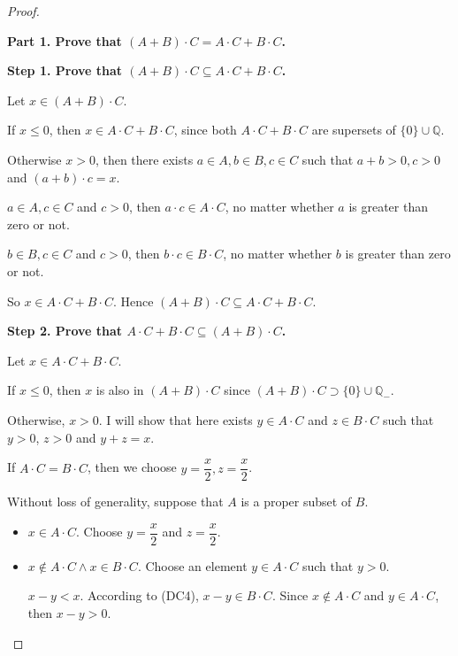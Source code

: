 \begin{proof}
\begin{enumerate}[label={(F\arabic*)}, start=5]
              \textbf{Part 1. Prove that $(A + B)\cdot C = A\cdot C + B\cdot C$.}

              \textbf{Step 1. Prove that $(A + B)\cdot C\subseteq A\cdot C + B\cdot C$.}

              Let $x\in (A + B)\cdot C$.

              If $x\le 0$, then $x\in A\cdot C + B\cdot C$, since both $A\cdot C + B\cdot C$ are supersets of $\{0\}\cup\mathbb{Q}$.

              \bigskip

              Otherwise $x > 0$, then there exists $a\in A, b\in B, c\in C$ such that $a + b > 0, c > 0$ and $(a + b)\cdot c = x$.

              $a\in A, c\in C$ and $c > 0$, then $a\cdot c\in A\cdot C$, no matter whether $a$ is greater than zero or not.

              $b\in B, c\in C$ and $c > 0$, then $b\cdot c\in B\cdot C$, no matter whether $b$ is greater than zero or not.

              So $x\in A\cdot C + B\cdot C$. Hence $(A + B)\cdot C\subseteq A\cdot C + B\cdot C$.

              \textbf{Step 2. Prove that $A\cdot C + B\cdot C\subseteq (A + B)\cdot C$.}

              Let $x\in A\cdot C + B\cdot C$.

              If $x\le 0$, then $x$ is also in $(A + B)\cdot C$ since $(A + B)\cdot C \supset \{0\}\cup\mathbb{Q}_{-}$.

              Otherwise, $x > 0$. I will show that here exists $y\in A\cdot C$ and $z\in B\cdot C$ such that $y > 0$, $z > 0$ and $y + z = x$.

              If $A\cdot C = B\cdot C$, then we choose $y = \dfrac{x}{2}, z = \dfrac{x}{2}$.

              Without loss of generality, suppose that $A$ is a proper subset of $B$.

              \begin{itemize}
                  \item $x\in A\cdot C$. Choose $y = \dfrac{x}{2}$ and $z = \dfrac{x}{2}$.
                  \item $x\notin A\cdot C\land x\in B\cdot C$.
                        Choose an element $y\in A\cdot C$ such that $y > 0$.

                        $x - y < x$. According to (DC4), $x - y\in B\cdot C$. Since $x\notin A\cdot C$ and $y\in A\cdot C$, then $x - y > 0$.


\end{itemize}
\end{enumerate}
\end{proof}
